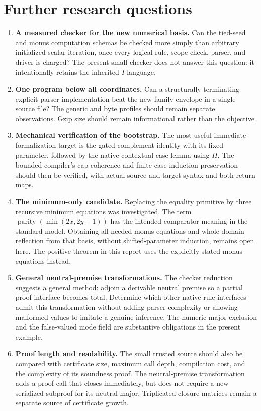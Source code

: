 \section{Further research questions}

\begin{enumerate}
\item \textbf{A measured checker for the new numerical basis.}
Can the tied-seed and monus computation schemas be checked more simply
than arbitrary initialized scalar iteration, once every logical rule,
scope check, parser, and driver is charged? The present small checker
does not answer this question: it intentionally retains the inherited
$I$ language.

\item \textbf{One program below all coordinates.}
Can a structurally terminating explicit-parser implementation beat the
new family envelope in a single source file? The generic and byte
profiles should remain separate observations. Gzip size should remain
informational rather than the objective.

\item \textbf{Mechanical verification of the bootstrap.}
The most useful immediate formalization target is the gated-complement
identity with its fixed parameter, followed by the native contextual-case
lemma using $H$. The bounded compiler's cap coherence and finite-case
induction preservation should then be verified, with actual source and
target syntax and both return maps.

\item \textbf{The minimum-only candidate.}
Replacing the equality primitive by three recursive minimum equations
was investigated. The term
$\operatorname{parity}(\min(2x,2y+1))$ has the intended comparator
meaning in the standard model. Obtaining all needed monus equations
and whole-domain reflection from that basis, without shifted-parameter
induction, remains open here. The positive theorem in this report uses
the explicitly stated monus equations instead.

\item \textbf{General neutral-premise transformations.}
The checker reduction suggests a general method: adjoin a derivable
neutral premise so a partial proof interface becomes total. Determine
which other native rule interfaces admit this transformation without
adding parser complexity or allowing malformed values to imitate a
genuine inference. The numeric-major exclusion and the false-valued
mode field are substantive obligations in the present example.

\item \textbf{Proof length and readability.}
The small trusted source should also be compared with certificate size,
maximum call depth, compilation cost, and the complexity of its soundness
proof. The neutral-premise transformation adds a proof call that closes
immediately, but does not require a new serialized subproof for its
neutral major. Triplicated closure matrices remain a separate source
of certificate growth.
\end{enumerate}

